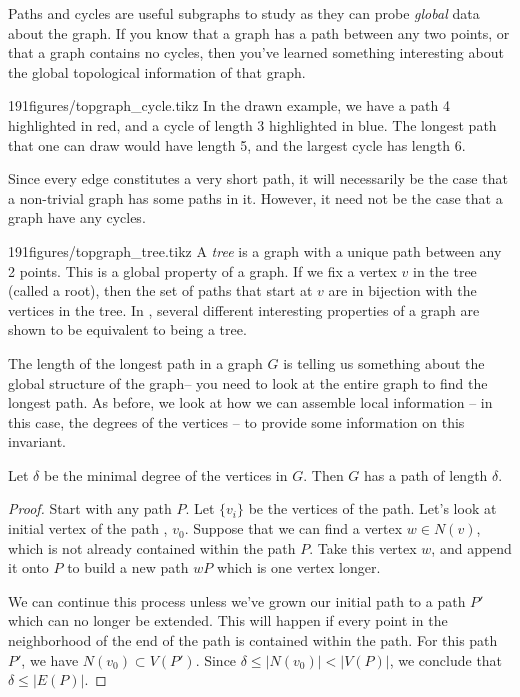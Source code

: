 Paths and cycles are useful subgraphs to study as they can probe \emph{global} data about the graph.
If you know that a graph has a path between any two points, or that a graph contains no cycles, then you've learned something interesting about the global topological information of that graph.

\begin{examplefigureenv}{191figures/topgraph_cycle.tikz}
 In the drawn example, we have a path 4 highlighted in red, and a cycle of length 3 highlighted in blue.
The longest path that one can draw would have length 5, and the largest cycle has length 6. 
\end{examplefigureenv}
Since every edge constitutes a very short path, it will necessarily be the case that a non-trivial graph has some paths in it.
However, it need not be the case that a graph have any cycles.
\begin{examplefigureenv}[Trees]{191figures/topgraph_tree.tikz}
	A \emph{tree} is a graph with a unique path between any 2 points. 
	This is a global property of a graph.
	If we fix a vertex $v$ in the tree (called a root), then the set of paths that start at $v$ are in bijection with the vertices in the tree.
	In , several different interesting properties of a graph are shown to be equivalent to being a tree. 
\end{examplefigureenv}
The length of the longest path in a graph $G$ is telling us something about the global structure of the graph-- you need to look at the entire graph to find the longest path.
As before, we look at how we can assemble local information -- in this case, the degrees of the vertices -- to provide some information on this invariant.
\begin{claim}
	Let $\delta$ be the minimal degree of the vertices in $G$. Then $G$ has a path of length $\delta$. 
\end{claim}	
\begin{proof}
	Start with any path $P$.
	Let $\{v_i\}$ be the vertices of the path.
	Let's look at initial vertex of the path , $v_0$. 
	Suppose that we can find a vertex $w\in N(v)$, which is not already contained within the path $P$. 
	Take this vertex $w$, and append it onto $P$ to build a new path $wP$ which is one vertex longer.

	We can continue this process unless we've grown our initial path to a path  $P'$ which can no longer be extended. This will happen if every point in the neighborhood of the end of the path is contained within the path.  
	For this path $P'$, we have $N(v_0)\subset V(P')$.
	Since $\delta \leq |N(v_0)|<|V(P)|$, we conclude that $\delta \leq |E(P)|$. 
\end{proof}
